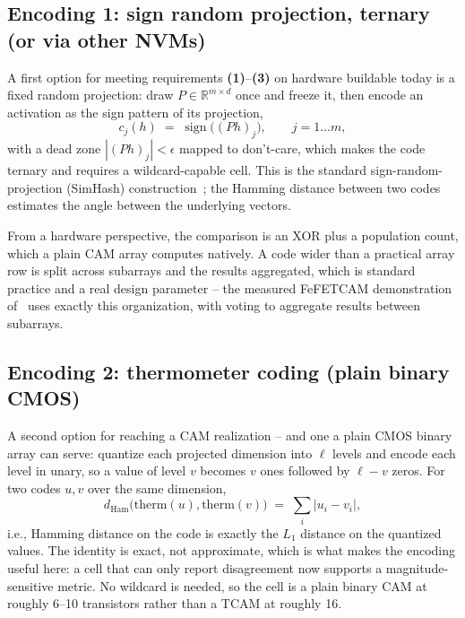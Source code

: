\documentclass[conference]{IEEEtran}
\newcommand{\cam}{{CAM}\xspace}
\newcommand{\tcam}{{TCAM}\xspace}
\newcommand{\fefet}{{FeFET}\xspace}
\begin{document}
\subsection{Encoding 1: sign random projection, ternary (or via other
NVMs)}
\label{subsec:SignRP}
A first option for meeting requirements {\bf (1)}--{\bf (3)} on
hardware buildable today is a fixed random projection: draw
$P \in \mathbb{R}^{m \times d}$ once and freeze it, then encode an
activation as the sign pattern of its projection,
%
\begin{equation}
c_j(h) \;=\; \operatorname{sign}\!\big( (Ph)_j \big), \qquad j = 1 \ldots m,
\label{eq:signrp}
\end{equation}
%
with a dead zone $|(Ph)_j| < \epsilon$ mapped to don't-care, which makes
the code ternary and requires a wildcard-capable cell. This is the
standard sign-random-projection (SimHash)
construction~\cite{charikar2002simhash}; the Hamming distance between
two codes estimates the angle between the underlying
vectors.

From a hardware perspective, the comparison is an XOR plus a
population count, which a plain
\cam array computes natively. A code wider than a practical array row
is split across subarrays and the results aggregated, which is
standard practice and a real design parameter -- the measured
\fefet \cam demonstration of~\cite{kazemi2022hdcfefet} uses exactly
this organization, with voting to aggregate results between
subarrays.

\subsection{Encoding 2: thermometer coding (plain binary CMOS)}
\label{subsec:Thermometer}
A second option for reaching a \cam realization -- and one a plain
CMOS binary array can serve: quantize each projected dimension into
$\ell$ levels and encode each
level in unary, so a value of level $v$ becomes $v$ ones followed by
$\ell-v$ zeros. For two codes $u,v$ over the same dimension,
%
\begin{equation}
d_{\mathrm{Ham}}\big(\mathrm{therm}(u), \mathrm{therm}(v)\big)
\;=\; \sum_i \big| u_i - v_i \big|,
\label{eq:thermo}
\end{equation}
%
i.e., Hamming distance on the code is exactly the $L_1$ distance on the
quantized values. The identity is exact, not approximate, which is what
makes the encoding useful here: a cell that can only report disagreement
now supports a magnitude-sensitive metric. No wildcard is needed, so
the cell is a plain binary \cam at roughly 6--10 transistors rather than
a \tcam at roughly 16.
\end{document}
